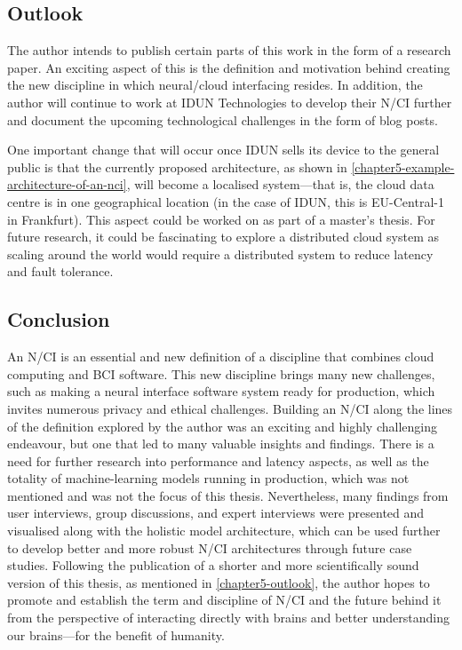 \subsection{Outlook}
\label{chapter5-outlook}

The author intends to publish certain parts of this work in the form of a research paper. An exciting aspect of this is the definition and motivation behind creating the new discipline in which neural/cloud interfacing resides. In addition, the author will continue to work at IDUN Technologies to develop their N/CI further and document the upcoming technological challenges in the form of blog posts.

One important change that will occur once IDUN sells its device to the general public is that the currently proposed architecture, as shown in \autoref{chapter5-example-architecture-of-an-nci}, will become a localised system—that is, the cloud data centre is in one geographical location (in the case of IDUN, this is EU-Central-1 in Frankfurt). This aspect could be worked on as part of a master’s thesis. For future research, it could be fascinating to explore a distributed cloud system as scaling around the world would require a distributed system to reduce latency and fault tolerance.

\subsection{Conclusion}
\label{chapter5-conclusion}

An N/CI is an essential and new definition of a discipline that combines cloud computing and BCI software. This new discipline brings many new challenges, such as making a neural interface software system ready for production, which invites numerous privacy and ethical challenges. Building an N/CI along the lines of the definition explored by the author was an exciting and highly challenging endeavour, but one that led to many valuable insights and findings. There is a need for further research into performance and latency aspects, as well as the totality of machine-learning models running in production, which was not mentioned and was not the focus of this thesis. Nevertheless, many findings from user interviews, group discussions, and expert interviews were presented and visualised along with the holistic model architecture, which can be used further to develop better and more robust N/CI architectures through future case studies. Following the publication of a shorter and more scientifically sound version of this thesis, as mentioned in \autoref{chapter5-outlook}, the author hopes to promote and establish the term and discipline of N/CI and the future behind it from the perspective of interacting directly with brains and better understanding our brains—for the benefit of humanity.

